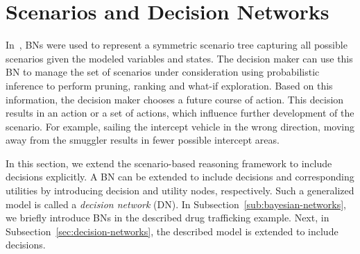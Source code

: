 \documentclass[conference]{IEEEtran}
\begin{document}
\section{Scenarios and Decision Networks}\label{sec:scenarios-decision-network}

In~\cite{conrado14if}, BNs were used to represent a symmetric scenario tree capturing all possible scenarios given the modeled variables and states. The decision maker can use this BN to manage the set of scenarios under consideration using probabilistic inference to perform pruning, ranking and what-if exploration. Based on this information, the decision maker chooses a future course of action. %
This decision results in an action or a set of actions, which influence further development of the scenario. For example, sailing the intercept vehicle in the wrong direction, \ie moving away from the smuggler results in fewer possible intercept areas. 

In this section, we extend the scenario-based reasoning framework to include decisions explicitly. A BN can be extended to include decisions and corresponding utilities by introducing decision and utility nodes, respectively. Such a generalized model is called a {\em decision network} (DN). In Subsection~\ref{sub:bayesian-networks}, we briefly introduce BNs in the described drug trafficking example. Next, in Subsection~\ref{sec:decision-networks}, the described model is extended to include decisions.

\begin{figure}
\begin{center}
 \qquad
{}
 \caption{}
\end{center}
\end{figure}
\end{document}
